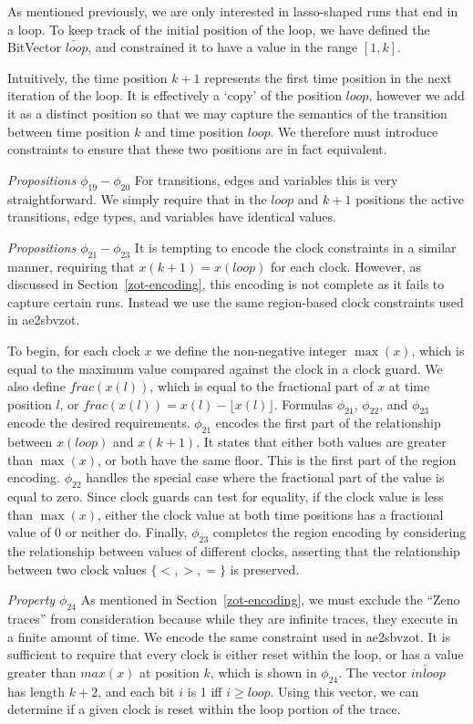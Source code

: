 \documentclass[a4paper,11pt]{report}
\theoremstyle{definition}
\newcommand{\aez}{ae2sbvzot}
\begin{document}
As mentioned previously, we are only interested in lasso-shaped runs that end in
a loop. To keep track of the initial position of the loop, we have defined the
BitVector \(\overleftarrow{loop}\), and constrained it to have a value in the
range \([1,k]\).

Intuitively, the time position \(k{+}1\) represents the first time position in the
next iteration of the loop. It is effectively a `copy' of the position
\(loop\), however we add it as a distinct position so that we may capture
the semantics of the transition between time position \(k\) and time position
\(loop\). We therefore must introduce constraints to ensure that these two
positions are in fact equivalent.

\emph{Propositions $\phi_{19}-\phi_{20}$} For transitions, edges and variables
this is very straightforward. We simply require that in the $loop$ and $k{+}1$
positions the active transitions, edge types, and variables have identical
values.

\emph{Propositions $\phi_{21}-\phi_{23}$} It is tempting to encode the clock
constraints in a similar manner, requiring that \(x(k+1) = x(loop)\) for each
clock. However, as discussed in Section~\ref{zot-encoding}, this encoding is not
complete as it fails to capture certain runs. Instead we use the same
region-based clock constraints used in \aez.

To begin, for each clock
\(x\) we define the non-negative integer \(\max(x)\), which is equal to the
maximum value compared
against the clock in a clock guard. We also define \(frac(x(l))\), which is
equal to the fractional part of \(x\) at time position \(l\), or
\(frac(x(l)) = x(l) - \lfloor x(l) \rfloor\). Formulas \(\phi_{21}\),
\(\phi_{22}\), and \(\phi_{23}\) encode the desired requirements. \(\phi_{21}\)
encodes the first part of the relationship between \(x(loop)\) and \(x(k+1)\).
It states that either both values are greater than \(\max(x)\), or both have the
same floor. This is the first part of the region encoding. \(\phi_{22}\) handles
the special case where the fractional part of the value is equal to zero. Since
clock guards can test for equality, if the clock value is less than \(\max(x)\),
either the clock value at both time positions has a fractional value of 0 or
neither do. Finally, \(\phi_{23}\) completes the region encoding by considering
the relationship between values of different clocks, asserting that the
relationship between two clock values \(\{<,>,=\}\) is preserved.

\emph{Property $\phi_{24}$} As mentioned in Section~\ref{zot-encoding}, we must
exclude the ``Zeno traces'' from consideration because while they are infinite
traces, they execute in a finite amount of time. We encode the same constraint
used in \aez. It is sufficient to require that every clock is either reset
within the loop, or has a value greater than \(max(x)\) at position \(k\), which
is shown in \(\phi_{24}\). The vector \(\overleftarrow{inloop}\) has length
\(k+2\), and each bit \(i\) is 1 iff \(i \geq loop\). Using this vector, we can
determine if a given clock is reset within the loop portion of the trace.
\end{document}
